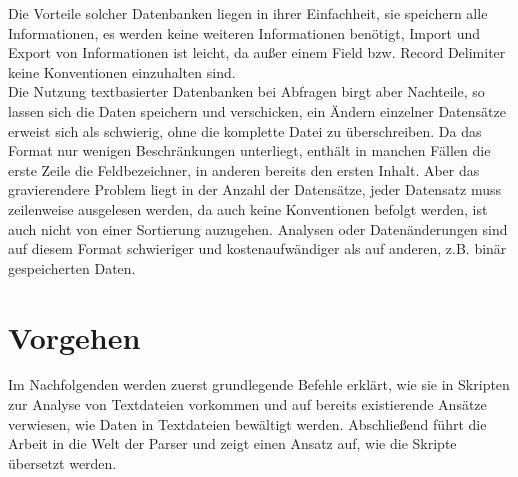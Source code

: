 Die Vorteile solcher Datenbanken liegen in ihrer Einfachheit, sie speichern alle Informationen, es werden keine weiteren Informationen benötigt, Import und Export von Informationen ist leicht, da außer einem Field bzw. Record Delimiter keine Konventionen einzuhalten sind.\\

Die Nutzung textbasierter Datenbanken bei Abfragen birgt aber Nachteile, so lassen sich die Daten speichern und verschicken, ein Ändern einzelner Datensätze erweist sich als schwierig, ohne die komplette Datei zu überschreiben. Da das Format nur wenigen Beschränkungen unterliegt, enthält in manchen Fällen die erste Zeile die Feldbezeichner, in anderen bereits den ersten Inhalt.
Aber das gravierendere Problem liegt in der Anzahl der Datensätze, jeder Datensatz muss zeilenweise ausgelesen werden, da auch keine Konventionen befolgt werden, ist auch nicht von einer Sortierung auzugehen. Analysen oder Datenänderungen sind auf diesem Format schwieriger und kostenaufwändiger als auf anderen, z.B. binär gespeicherten Daten.

\section{Vorgehen}
Im Nachfolgenden werden zuerst grundlegende Befehle erklärt, wie sie in Skripten zur Analyse von Textdateien vorkommen und auf bereits existierende Ansätze verwiesen, wie Daten in Textdateien bewältigt werden. Abschließend führt die Arbeit in die Welt der Parser und zeigt einen Ansatz auf, wie die Skripte übersetzt werden.
